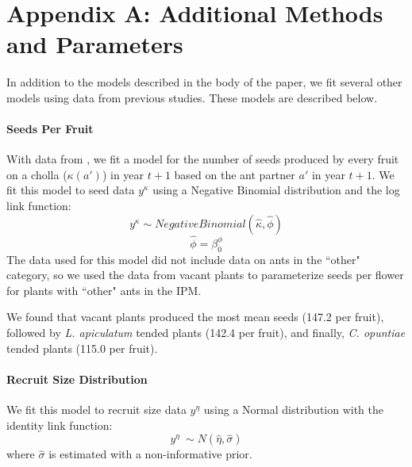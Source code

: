 \documentclass[11pt]{article}
\begin{document}
\renewcommand{\theequation}{A\arabic{equation}}
\renewcommand{\thetable}{A\arabic{table}}
\setcounter{equation}{0}  %
\setcounter{figure}{0}
\setcounter{table}{0}

%
%




\newpage{}


\appendix
\label{appendix}
\section*{Appendix A: Additional Methods and Parameters} \label{appendix:A}
In addition to the models described in the body of the paper, we fit several other models using data from previous studies.
These models are described below.

\paragraph{Seeds Per Fruit}
With data from \cite{Miller2006}, we fit a model for the number of seeds produced by every fruit on a cholla ($\kappa(a')$) in year $t+1$ based on the ant partner $a'$ in year $t+1$.
We fit this model to seed data $y^{\kappa}$ using a Negative Binomial distribution and the log link function: 
$$y^{\kappa} \sim  Negative Binomial(\hat{\kappa},\hat{\phi})$$
$$\hat{\phi} = \beta_{0}^{\phi}$$
The data used for this model did not include data on ants in the ``other" category, so we used the data from vacant plants to parameterize seeds per flower for plants with ``other" ants in the IPM.

We found that vacant plants produced the most mean seeds (147.2 per fruit), followed by \textit{L. apiculatum} tended plants (142.4 per fruit), and finally, \textit{C. opuntiae} tended plants (115.0 per fruit).


\paragraph{Recruit Size Distribution}
We fit this model to recruit size data $y^{\eta}$ using a Normal distribution with the identity link function: 
$$y^{\eta} ~\sim N(\hat{\eta},\hat{\sigma})$$
where $\hat{\sigma}$ is estimated with a non-informative prior. 
\end{document}
